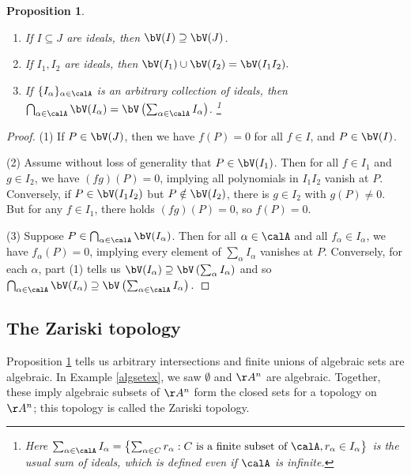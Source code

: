 \documentclass[12pt]{amsart}
\theoremstyle{plain}
\newtheorem{proposition}[theorem]{Proposition}
\theoremstyle{definition}
\begin{document}
\begin{proposition}\label{vproperties}
\begin{enumerate}
\item If $I \subseteq J$ are ideals, then $\bV(I) \supseteq \bV(J)$.
\item If $I_1, I_2$ are ideals, then $\bV(I_1) \cup \bV(I_2) = \bV(I_1 I_2).$
\item If $\{I_\alpha\}_{\alpha \in \calA}$ is an arbitrary collection of ideals, then $\bigcap_{\alpha \in \calA} \bV(I_\alpha) = \bV\left(\sum_{\alpha \in \calA} I_\alpha\right)$.
\footnote{Here $\sum_{\alpha\in\calA} I_\alpha = \left\{\sum_{\alpha \in C} r_\alpha : C \text{ is a finite subset of } \calA, r_\alpha \in I_\alpha \right\}$ is the usual sum of ideals, which is defined even if $\calA$ is infinite.}
\end{enumerate}
\end{proposition}
\begin{proof}
(1) If $P \in \bV(J)$, then we have $f(P)=0$ for all $f \in I$, and $P \in \bV(I)$.

(2) Assume without loss of generality that $P \in \bV(I_1)$.
Then for all $f \in I_1$ and $g \in I_2$, we have $(fg)(P)=0$, implying all polynomials in $I_1 I_2$ vanish at $P$.
Conversely, if $P \in \bV(I_1 I_2)$ but $P \notin \bV(I_2)$, there is $g \in I_2$ with $g(P) \ne 0$.
But for any $f \in I_1$, there holds $(fg)(P)=0$, so $f(P)=0$.

(3) Suppose $P \in \bigcap_{\alpha \in \calA} \bV(I_\alpha)$.
Then for all $\alpha \in \calA$ and all $f_\alpha \in I_\alpha$, we have $f_\alpha(P) = 0$, implying every element of $\sum_{\alpha} I_\alpha$ vanishes at $P$.
Conversely, for each $\alpha$, part (1) tells us $\bV(I_\alpha) \supseteq \bV\left(\sum_{\alpha} I_\alpha\right)$ and so 
$\bigcap_{\alpha\in\calA} \bV(I_\alpha) \supseteq \bV\left(\sum_{\alpha\in\calA} I_\alpha\right).$
\end{proof}





\subsection{The Zariski topology}
Proposition \ref{vproperties} tells us arbitrary intersections and finite unions of algebraic sets are algebraic.
In Example \ref{algsetex}, we saw $\emptyset$ and $\AA^n$ are algebraic.
Together, these imply algebraic subsets of $\AA^n$ form the closed sets for a topology on $\AA^n$; this topology is called the Zariski topology.
\end{document}
